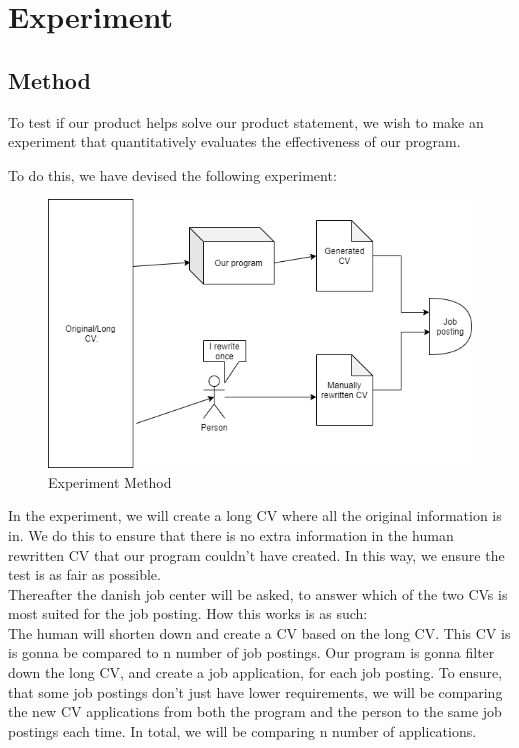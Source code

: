 \section{Experiment}\label{sec:method}
\subsection{Method}
To test if our product helps solve our product statement, we wish
to make an experiment that quantitatively evaluates the effectiveness of our
program. 

To do this, we have devised the following experiment:
\begin{figure}[H]
  \centering
  \includegraphics[scale = 0.6]{figures/experiment1.png}
  \caption{Experiment Method}\label{fig:ie}
\end{figure} 
In the experiment, we will create a long CV where all the original information
is in. We do this to ensure that there is no extra information in the human 
rewritten CV that our program couldn't have created. In this way, we ensure
the test is as fair as possible.\\

Thereafter the danish job center will be asked, to answer which of the two CVs is most suited
for the job posting. How this works is as such: \\

The human will shorten down and create a CV based on the long CV. This CV is
is gonna be compared to n number of job postings.
Our program is gonna filter down the long CV, and create a job application,
for each job posting. 
To ensure, that some job postings don't just have lower requirements, we will be
comparing the new CV applications from both the program and the person to the same job postings each time. In total, we will be comparing n number of applications. \\

